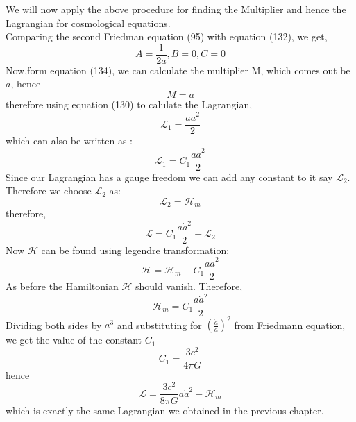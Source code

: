\documentclass[14pt]{extarticle}
\begin{document}
We will now apply the above procedure for finding the Multiplier and hence the Lagrangian for cosmological equations.\\
Comparing the second Friedman equation (95) with equation (132), we get,\\
\begin{equation}
A=\frac{1}{2 a} , B=0, C=0
\end{equation}
Now,form equation (134), we can calculate the multiplier M, which comes out be $a$, hence \\
\begin{equation}
M=a
\end{equation}
therefore using equation (130) to calulate the Lagrangian,\\
\begin{equation}
\mathcal{L}_{1} = \frac{a \dot{a}^{2}}{2} 
\end{equation}
which can also be written as :\\
\begin{equation}
\mathcal{L}_{1}=C_{1}\frac{a \dot{a}^{2}}{2}
\end{equation}
Since our Lagrangian has a gauge freedom we can add any constant to it say $\mathcal{L}_{2}$. Therefore we choose $\mathcal{L}_{2}$ as:\\
\begin{equation}
\mathcal{L}_{2} = \mathcal{H}_{m}
\end{equation}
therefore,\\
\begin{equation}
\mathcal{L}= C_{1} \frac{a \dot{a}^{2}}{2} + \mathcal{L}_{2}
\end{equation}
Now $\mathcal{H}$ can be found using legendre transformation:\\
\begin{equation}
\mathcal{H} = \mathcal{H}_{m} - C_{1} \frac{a \dot{a}^{2}}{2}
\end{equation}
As before the Hamiltonian $\mathcal{H}$ should vanish. Therefore,\\
\begin{equation}
\mathcal{H}_{m} = C_{1} \frac{a \dot{a}^{2}}{2}
\end{equation} 
Dividing both sides by $a^{3}$ and substituting for $\left(\frac{\dot{a}}{a}\right)^{2}$ from Friedmann equation, we get the value of the constant $C_{1}$\\
\begin{equation}
C_{1} = \frac{3 c^{2}}{4 \pi G}
\end{equation}
hence \\
\begin{equation}
\mathcal{L}= \frac{3 c^{2}}{8 \pi G} a \dot{a}^{2} - \mathcal{H}_{m}
\end{equation}
which is exactly the same Lagrangian we obtained in the previous chapter.
\end{document}
